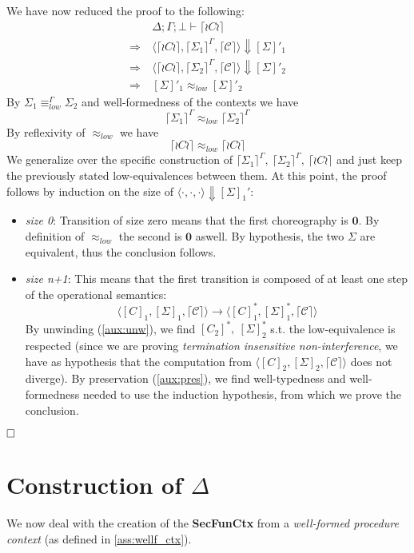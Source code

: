 \documentclass[12pt,a4paper,twoside]{book}
\newcommand{\qed}{\hfill\square}
\begin{document}
\bigskip
\noindent We have now reduced the proof to the following:
\begin{align*}
	&\Delta;\Gamma;\bot \vdash \lceil \wr C \wr \rceil \\
	\Rightarrow\ &\langle \lceil \wr C \wr \rceil, \lceil \Sigma_1 \rceil^\Gamma, \lceil \mathscr{C} \rceil\rangle \Downarrow [\Sigma]'_1 \\
	\Rightarrow\ &\langle \lceil \wr C \wr \rceil, \lceil \Sigma_2 \rceil^\Gamma, \lceil \mathscr{C} \rceil\rangle \Downarrow [\Sigma]'_2 \\
	\Rightarrow\ &[\Sigma]'_1 \approx_{low} [\Sigma]'_2
\end{align*}
By $\Sigma_1 \equiv^\Gamma_{low} \Sigma_2$ and well-formedness of the contexts we have
$$
\lceil \Sigma_1 \rceil^\Gamma \approx_{low} \lceil \Sigma_2 \rceil^\Gamma
$$
By reflexivity of $\approx_{low}$ we have
$$
\lceil \wr C \wr \rceil \approx_{low} \lceil \wr C \wr \rceil
$$
We generalize over the specific construction of
$ \lceil \Sigma_1 \rceil^\Gamma,~\lceil \Sigma_2 \rceil^\Gamma,~\lceil \wr C \wr \rceil $ and just keep the previously stated low-equivalences between them.
At this point, the proof follows by induction on the size of $\langle \cdot, \cdot, \cdot\rangle \Downarrow [\Sigma]_1'$:
\begin{itemize}
	\item \emph{size 0}: Transition of size zero means that the first choreography is $\boldsymbol{0}$. By definition of $\approx_{low}$ the second is $\boldsymbol{0}$ aswell. By hypothesis, the two $\Sigma$ are equivalent, thus the conclusion follows.
	\item \emph{size n+1}: This means that the first transition is composed of at least one step of the operational semantics:
$$
		\langle [C]_1, [\Sigma]_1, \lceil\mathscr{C}\rceil\rangle \rightarrow
		\langle [C]_1^*, [\Sigma]_1^*, \lceil\mathscr{C}\rceil\rangle
$$
		By unwinding (\ref{aux:unw}), we find $[C_2]^*,~[\Sigma]_2^*$ s.t. the low-equivalence is respected (since we are proving \emph{termination insensitive non-interference}, we have as hypothesis that the computation from $\langle [C]_2, [\Sigma]_2, \lceil\mathscr{C}\rceil\rangle$ does not diverge).
		By preservation (\ref{aux:pres}), we find well-typedness and well-formedness needed to use the induction hypothesis, from which we prove the conclusion.
\end{itemize}
$\qed$

\chapter{Construction of $\Delta$}\label{chap:delta}
We now deal with the creation of the \textbf{SecFunCtx} from a \emph{well-formed procedure context} (as defined in \ref{ass:wellf_ctx}).
\end{document}
